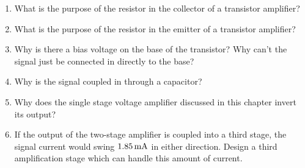 
\begin{enumerate}
\item What is the purpose of the resistor in the collector of a transistor amplifier?
\item What is the purpose of the resistor in the emitter of a transistor amplifier?
\item Why is there a bias voltage on the base of the transistor?  Why can't the signal just be connected in directly to the base?
\item Why is the signal coupled in through a capacitor?
\item Why does the single stage voltage amplifier discussed in this chapter invert its output?
\item If the output of the two-stage amplifier is coupled into a third stage, the signal current would swing $1.85\,\si{\milli\ampere}$ in either direction.  Design a third amplification stage which can handle this amount of current.
\end{enumerate}
